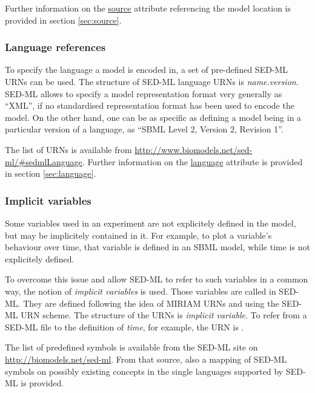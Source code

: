 Further information on the \hyperref[sec:source]{source} attribute referencing the model location is provided in section \ref{sec:source}.

\subsubsection{Language references}
To specify the language a model is encoded in, a set of pre-defined SED-ML URNs can be used. 
The structure of SED-ML language URNs is \emph{name.version}. 
SED-ML allows to specify a model representation format very generally as ``XML'', if no standardised representation format has been used to encode the model. On the other hand, one can be as specific as defining
a model being in a particular version of a language, as ``SBML Level 2, Version 2, Revision 1''.

The list of URNs is available from \url{http://www.biomodels.net/sed-ml/#sedmlLanguage}. 
Further information on the \hyperref[sec:language]{language} attribute is provided in section \ref{sec:language}.

\subsubsection{Implicit variables}
\label{sec:implicitVariable}

Some variables used in an experiment are not explicitely defined in the model, but may be implicitely contained in it. 
For example, to plot a variable's behaviour over time, that variable is defined in an SBML model, while time is not explicitely defined. 

To overcome this issue and allow SED-ML to refer to such variables in a common way, the notion of \emph{implicit variables} is used.
Those variables are called  in SED-ML. They are defined following the idea of MIRIAM URNs and using the SED-ML URN scheme. The structure of the URNs is \emph{implicit variable}.
To refer from a SED-ML file to the definition of \emph{time}, for example, the URN is .

The list of predefined symbols is available from the SED-ML site on \url{http://biomodels.net/sed-ml}.
From that source, also a mapping of SED-ML symbols on possibly existing concepts in the single languages supported by SED-ML is provided.



